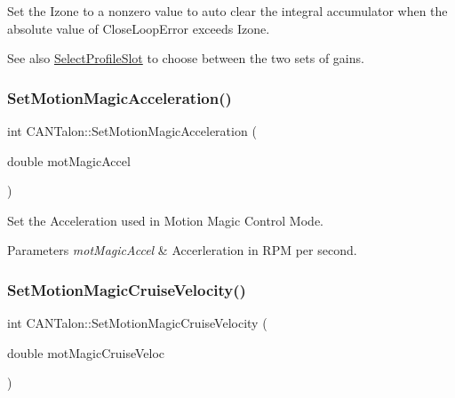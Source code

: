 Set the Izone to a nonzero value to auto clear the integral accumulator when the absolute value of Close\+Loop\+Error exceeds Izone.

\begin{DoxySeeAlso}{See also}
\hyperlink{class_c_a_n_talon_a0f478462884ed5e541179821c44b724f}{Select\+Profile\+Slot} to choose between the two sets of gains. 
\end{DoxySeeAlso}
\mbox{\label{class_c_a_n_talon_afefd0924fb061af16b59219ee9f71b21}} 
\subsubsection{\texorpdfstring{Set\+Motion\+Magic\+Acceleration()}{SetMotionMagicAcceleration()}}
{\footnotesize\ttfamily int C\+A\+N\+Talon\+::\+Set\+Motion\+Magic\+Acceleration (\begin{DoxyParamCaption}\item[{double}]{mot\+Magic\+Accel }\end{DoxyParamCaption})}

Set the Acceleration used in Motion Magic Control Mode. 
\begin{DoxyParams}{Parameters}
{\em mot\+Magic\+Accel} & Accerleration in R\+PM per second. \\
\hline
\end{DoxyParams}
\mbox{\label{class_c_a_n_talon_aa7cb01a5984ae5e93384792f46be21f8}} 
\subsubsection{\texorpdfstring{Set\+Motion\+Magic\+Cruise\+Velocity()}{SetMotionMagicCruiseVelocity()}}
{\footnotesize\ttfamily int C\+A\+N\+Talon\+::\+Set\+Motion\+Magic\+Cruise\+Velocity (\begin{DoxyParamCaption}\item[{double}]{mot\+Magic\+Cruise\+Veloc }\end{DoxyParamCaption})}

